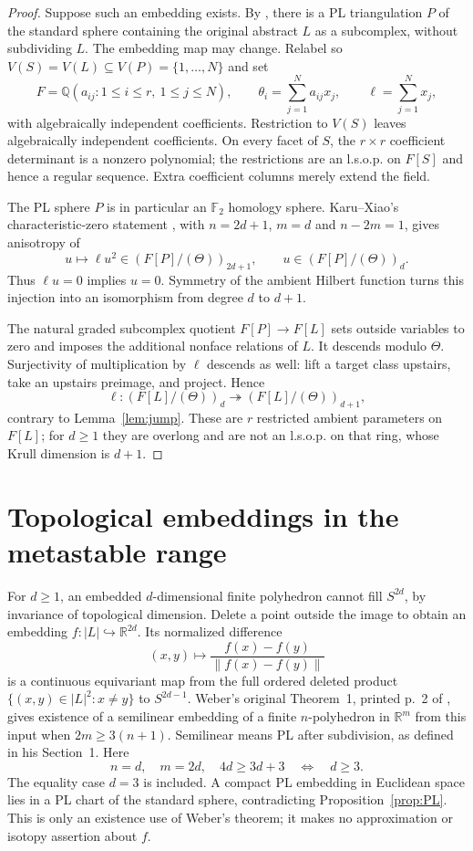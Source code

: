 \documentclass[11pt]{article}
\theoremstyle{remark}
\newcommand{\F}{\mathbb F}
\newcommand{\Q}{\mathbb Q}
\newcommand{\R}{\mathbb R}
\begin{document}
\begin{proof}
Suppose such an embedding exists. By \cite[Theorem~2]{AP}, there is a
PL triangulation $P$ of the standard sphere containing the original
abstract $L$ as a subcomplex, without subdividing $L$. The embedding map
may change. Relabel so $V(S)=V(L)\subseteq V(P)=\{1,\ldots,N\}$ and set
\[
F=\Q(a_{ij}:1\leq i\leq r,\ 1\leq j\leq N),\qquad
\theta_i=\sum_{j=1}^N a_{ij}x_j,\qquad \ell=\sum_{j=1}^N x_j,
\]
with algebraically independent coefficients. Restriction to $V(S)$
leaves algebraically independent coefficients. On every facet of $S$,
the $r\times r$ coefficient determinant is a nonzero polynomial;
the restrictions are an l.s.o.p. on $F[S]$ and hence a regular sequence.
Extra coefficient columns merely extend the field.

The PL sphere $P$ is in particular an $\F_2$ homology sphere.
Karu--Xiao's characteristic-zero statement
\cite[Theorems~1.2--1.3]{KX}, with $n=2d+1$, $m=d$ and $n-2m=1$,
gives anisotropy of
\[
u\longmapsto\ell u^2\in(F[P]/(\Theta))_{2d+1},
\qquad u\in(F[P]/(\Theta))_d.
\]
Thus $\ell u=0$ implies $u=0$. Symmetry of the ambient Hilbert function
turns this injection into an isomorphism from degree $d$ to $d+1$.

The natural graded subcomplex quotient $F[P]\to F[L]$ sets outside
variables to zero and imposes the additional nonface relations of $L$.
It descends modulo $\Theta$. Surjectivity of multiplication by $\ell$
descends as well: lift a target class upstairs, take an upstairs
preimage, and project. Hence
\[
\ell:(F[L]/(\Theta))_d\twoheadrightarrow(F[L]/(\Theta))_{d+1},
\]
contrary to Lemma~\ref{lem:jump}. These are $r$ restricted ambient
parameters on $F[L]$; for $d\geq1$ they are overlong and are not an
l.s.o.p. on that ring, whose Krull dimension is $d+1$.
\end{proof}

\section{Topological embeddings in the metastable range}

For $d\geq1$, an embedded $d$-dimensional finite polyhedron cannot fill
$S^{2d}$, by invariance of topological dimension. Delete a point outside
the image to obtain an embedding $f:|L|\hookrightarrow\R^{2d}$.
Its normalized difference
\[
(x,y)\longmapsto\frac{f(x)-f(y)}{\|f(x)-f(y)\|}
\]
is a continuous equivariant map from the full ordered deleted product
$\{(x,y)\in|L|^2:x\ne y\}$ to $S^{2d-1}$.
Weber's original Theorem~1, printed p.~2 of \cite{W}, gives existence
of a semilinear embedding of a finite $n$-polyhedron in $\R^m$ from
this input when $2m\geq3(n+1)$. Semilinear means PL after subdivision,
as defined in his Section~1. Here
\[
n=d,\quad m=2d,\quad 4d\geq3d+3\quad\Longleftrightarrow\quad d\geq3.
\]
The equality case $d=3$ is included. A compact PL embedding in Euclidean
space lies in a PL chart of the standard sphere, contradicting
Proposition~\ref{prop:PL}. This is only an existence use of Weber's
theorem; it makes no approximation or isotopy assertion about $f$.
\end{document}
